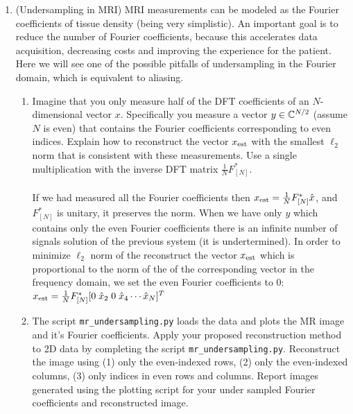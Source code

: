 \documentclass[12pt,twoside]{article}
\begin{document}
\begin{enumerate}
  \newpage
  \item (Undersampling in MRI) MRI measurements can be modeled as the Fourier coefficients of tissue density (being very simplistic). An important goal is to reduce the number of Fourier coefficients, because this accelerates data acquisition, decreasing costs and improving the experience for the patient. Here we will see one of the possible pitfalls of undersampling in the Fourier domain, which is equivalent to aliasing.
 \begin{enumerate}
 \item Imagine that you only measure half of the DFT coefficients of an $N$-dimensional vector $x$.  Specifically you measure a vector $y \in \mathbb{C}^{N/2}$ (assume $N$ is even) that contains the Fourier coefficients corresponding to even indices. Explain how to reconstruct the vector $x_{\operatorname{est}}$ with the smallest $\ell_2$ norm that is consistent with these measurements. Use a single multiplication with the inverse DFT matrix $\frac{1}{N}F_{[N]}^{\ast}$.\\ \\
 If we had measured all the  Fourier coefficients then $x_{\operatorname{est}} = \frac{1}{N}F_{[N]}^{\ast} \hat{x}$, and $F_{[N]}^{\ast}$ is unitary, it preserves the norm. When  we have only $y$ which contains only the even Fourier coefficients there is an infinite number of signals solution of the previous system (it is undertermined). In order to minimize  $\ell_2$ norm of the reconstruct the vector $x_{\operatorname{est}}$ which is proportional to the norm of the of the corresponding vector in the frequency domain, we set the even Fourier coefficients to $0$: $x_{\operatorname{est}} = \frac{1}{N}F_{[N]}^{\ast} [0 \; \hat{x}_2 \;0 \; \hat{x}_4 \cdots \hat{x}_N]^T$
 
 \item The script  \texttt{mr\_undersampling.py} loads the data and plots the MR image and it's Fourier coefficients. Apply your proposed reconstruction method to 2D data by completing the script \texttt{mr\_undersampling.py}.  Reconstruct the image using (1) only the even-indexed rows, (2) only the even-indexed columns, (3) only indices in even rows and columns. Report images generated using the plotting script for your under sampled Fourier coefficients and reconstructed image.  


\end{enumerate}
\end{enumerate}
\end{document}
